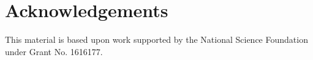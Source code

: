 \section{Acknowledgements}

This material is based upon work supported by the National Science Foundation under Grant No. 1616177. 

